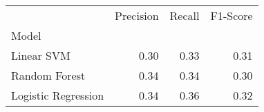 \begin{tabular}{lrrr}
\toprule
 & Precision & Recall & F1-Score \\
Model &  &  &  \\
\midrule
Linear SVM & 0.30 & 0.33 & 0.31 \\
Random Forest & 0.34 & 0.34 & 0.30 \\
Logistic Regression & 0.34 & 0.36 & 0.32 \\
\bottomrule
\end{tabular}
